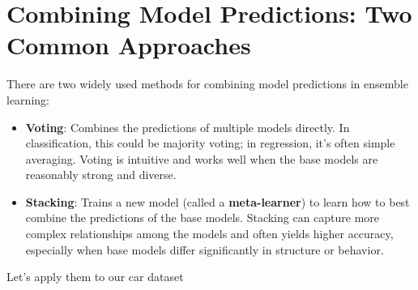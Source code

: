 \documentclass[
  letterpaper,
  DIV=11,
  numbers=noendperiod]{scrreprt}
\begin{document}
\section{Combining Model Predictions: Two Common
Approaches}\label{combining-model-predictions-two-common-approaches}

There are two widely used methods for combining model predictions in
ensemble learning:

\begin{itemize}
\item
  \textbf{Voting}: Combines the predictions of multiple models directly.
  In classification, this could be majority voting; in regression, it's
  often simple averaging. Voting is intuitive and works well when the
  base models are reasonably strong and diverse.
\item
  \textbf{Stacking}: Trains a new model (called a \textbf{meta-learner})
  to learn how to best combine the predictions of the base models.
  Stacking can capture more complex relationships among the models and
  often yields higher accuracy, especially when base models differ
  significantly in structure or behavior.
\end{itemize}

Let's apply them to our car dataset
\end{document}
